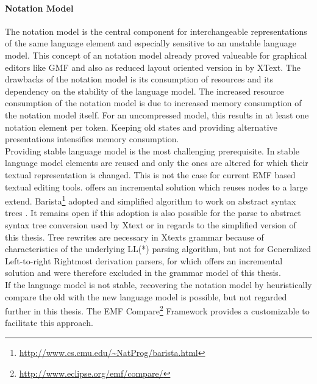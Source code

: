 \paragraph{Notation Model} The notation model is the central component for interchangeable representations of the same language element and especially sensitive to an unstable language model. This concept of an notation model already proved valueable for graphical editors like GMF and also as reduced layout oriented version in by XText. The drawbacks of the notation model is its consumption of resources and its dependency on the stability of the language model. The increased resource consumption of the notation model is due to increased memory consumption of the notation model itself. For an uncompressed model, this results in at least one notation element per token. Keeping old states and providing alternative presentations intensifies memory consumption. \\ %
Providing stable language model is the most challenging prerequisite. In stable language model elements are reused and only the ones are altered for which their textual representation is changed. This is not the case for current EMF based textual editing tools. \cite{iSW} offers an incremental solution which reuses nodes to a large extend. Barista\footnote{\raggedright \url{http://www.cs.cmu.edu/~NatProg/barista.html}} adopted and simplified \cite{iSW} algorithm to work on abstract syntax trees \cite{Barista}. It remains open if this adoption is also possible for the parse to abstract syntax tree conversion used by Xtext or in regards to the simplified  version of this thesis. Tree rewrites are necessary in Xtexts grammar because of characteristics of the underlying LL(*) parsing algorithm, but not for Generalized Left-to-right Rightmost derivation parsers, for which \cite{iSW} offers an incremental solution and were therefore excluded in the grammar model of this thesis. \\%
If the language model is not stable, recovering the notation model by heuristically compare the old with the new language model is possible, but not regarded further in this thesis. The EMF Compare\footnote{\raggedright \url{http://www.eclipse.org/emf/compare/}} Framework provides a customizable  to facilitate this approach. \\
